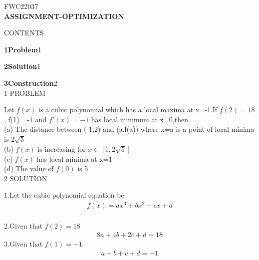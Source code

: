 \documentclass[a4paper,10pt]{report}
\begin{document}
\raggedleft FWC22037\vspace{2mm}\\
\centering\Large\textbf{ASSIGNMENT-OPTIMIZATION}\vspace{5mm}
\begin{multicols}{2}
\centering \large\textsc{C}\footnotesize\textsc{ONTENTS}\vspace{5mm}\\
\raggedright\large\textbf{1\hspace{1cm}Problem}\hspace{5.2cm}1\vspace{5mm}\\
\raggedright\large\textbf{2\hspace{1cm}Solution}\hspace{5.25cm}1\vspace{5mm}\\
\raggedright\large\textbf{3\hspace{1cm}Construction}\hspace{4.25cm}2\vspace{5mm}\\
\centering \large\textsc{1  P}\footnotesize\textsc{ROBLEM}\vspace{5mm}\\
	\raggedright\large{Let $f(x)$ is a cubic polynomial which has a local maxima at x=-1.If $f(2) = 18$, f(1)= -1 and $f'(x) = -1$ has local minimum at x=0,then \\
 	(a) The distance between (-1,2) and (a,f(a)) where x=a is a point of local minima is 2$\sqrt{5}$ \\
 	(b) $f(x)$ is increasing for $x \in [1,2\sqrt{5}]$\\
 	(c) $f(x)$ has local minima at x=1\\
 	(d) The value of $f(0)$ is 5 }\\\vspace{5mm}
\centering \large\textsc{2  S}\footnotesize\textsc{OLUTION}\vspace{5mm}\\
\raggedright\large{1.Let the cubic polynomial equation be \begin{align}
 f(x) = ax^3+bx^2+cx+d
 \end{align} } \\
2.Given that  $f(2)=18$
 \begin{align}
 8a+4b+2c+d=18
 \end{align}
3.Given that $f(1) = -1$
 \begin{align}
 a+b+c+d=-1\\

\end{align}
\end{multicols}
\end{document}

